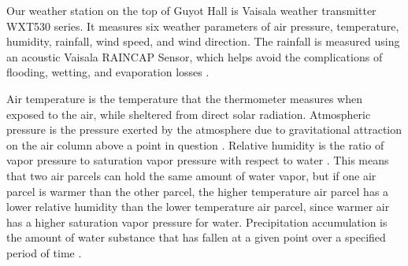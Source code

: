 \documentclass[11pt]{report}
\begin{document}
% 

Our weather station on the top of Guyot Hall is Vaisala weather transmitter
WXT530 series. It measures six weather parameters of air pressure,
temperature, humidity, rainfall, wind speed, and wind direction. The
rainfall is measured using an acoustic Vaisala RAINCAP Sensor, which helps
avoid the complications of flooding, wetting, and evaporation losses
\cite[]{Vaisala}.

Air temperature is the temperature that the thermometer measures when
exposed to the air, while sheltered from direct solar radiation.
Atmospheric pressure is the pressure exerted by the atmosphere due to
gravitational attraction on the air column above a point in question
\cite[]{AMS}. Relative humidity is the ratio of vapor pressure to saturation
vapor pressure with respect to water \cite{AMS}.  This means that two air
parcels can hold the same amount of water vapor, but if one air parcel is
warmer than the other parcel, the higher temperature air parcel has a lower
relative humidity than the lower temperature air parcel, since warmer air
has a higher saturation vapor pressure for water.  Precipitation
accumulation is the amount of water substance that has fallen at a given
point over a specified period of time \cite[]{AMS}.

\end{document}
